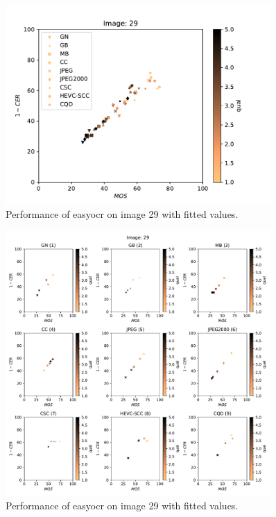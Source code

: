 \begin{figure}[h]
\centering
\includegraphics[width=0.9\textwidth]{../../images/analyze/mos_ter_fit_ezocr_img29.pdf}
\caption{Performance of easyocr on image 29 with fitted values.}
\label{fig:img29_fit}
\end{figure}

\begin{figure}[h]
\centering
\includegraphics[width=0.9\textwidth]{../../images/analyze/mos_ter_fit_ezocr_sub_img29.pdf}
\caption{Performance of easyocr on image 29 with fitted values.}
\label{fig:sub29_fit}
\end{figure}

